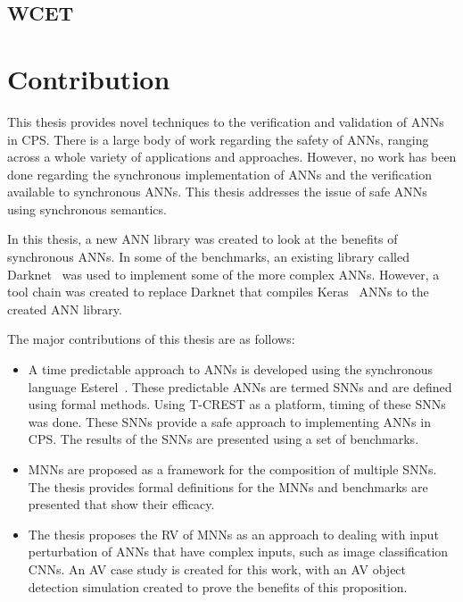 \subsection{\acf{WCET}}

\section{Contribution}
This thesis provides novel techniques to the verification and validation of \acfp{ANN} in \acf{CPS}.
There is a large body of work regarding the safety of \acp{ANN}, ranging across a whole variety of applications and approaches.
However, no work has been done regarding the synchronous implementation of \acp{ANN} and the verification available to synchronous \acp{ANN}.  
This thesis addresses the issue of safe \acp{ANN} using synchronous semantics.

In this thesis, a new \ac{ANN} library was created to look at the benefits of synchronous \acp{ANN}.
In some of the benchmarks, an existing library called Darknet~\cite{darknet13} was used to implement some of the more complex \acp{ANN}.
However, a tool chain was created to replace Darknet that compiles Keras~\cite{chollet2015keras} \acp{ANN} to the created \ac{ANN} library.

The major contributions of this thesis are as follows:
\begin{itemize}
	\item A time predictable approach to \acp{ANN} is developed using the synchronous language Esterel~\cite{berry2000foundations}. These predictable \acp{ANN} are termed \acfp{SNN} and are defined using formal methods. Using T-CREST as a platform, timing of these \acp{SNN} was done. These \acp{SNN} provide a safe approach to implementing \acp{ANN} in \ac{CPS}. The results of the \acp{SNN} are presented using a set of benchmarks. 
	\item \acfp{MNN} are proposed as a framework for the composition of multiple \acp{SNN}. The thesis provides formal definitions for the \acp{MNN} and benchmarks are presented that show their efficacy. 
	\item The thesis proposes the \acf{RV} of \acp{MNN} as an approach to dealing with input perturbation of \acp{ANN} that have complex inputs, such as image classification \acfp{CNN}. An \acf{AV} case study is created for this work, with an \ac{AV} object detection simulation created to prove the benefits of this proposition. 
\end{itemize}

